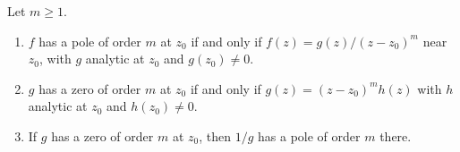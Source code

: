 \begin{theorem}\label{thm:poles}
  Let $m \geq 1$.
  \begin{enumerate}[label=(\roman*)]
    \item $f$ has a pole of order $m$ at $z_0$ if and only if
      $f(z) = g(z) / (z - z_0)^m$ near $z_0$, with $g$ analytic at $z_0$ and
      $g(z_0) \neq 0$.
    \item $g$ has a zero of order $m$ at $z_0$ if and only if
      $g(z) = (z - z_0)^m h(z)$ with $h$ analytic at $z_0$ and $h(z_0) \neq 0$.
    \item If $g$ has a zero of order $m$ at $z_0$, then $1/g$ has a pole of
      order $m$ there.
  \end{enumerate}
\end{theorem}
